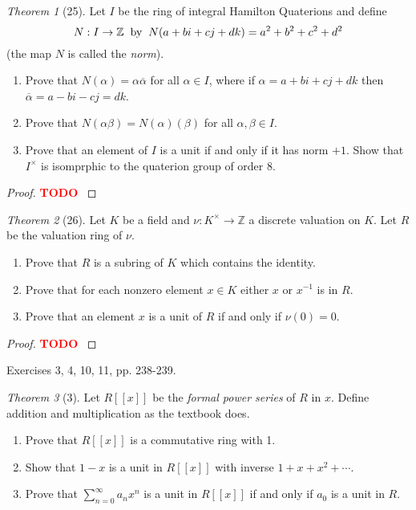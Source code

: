 \documentclass[12pt]{article}
\theoremstyle{remark}
\theoremstyle{named}
\newtheorem*{theorem}{Theorem}
\newcommand{\todo}{\textcolor{red}{\textbf{TODO} }}
\renewcommand{\a}{\alpha}
\renewcommand{\b}{\beta}
\newcommand{\Z}{\mathbb Z}
\begin{document}
\begin{theorem}[25]
    Let \(I\) be the ring of integral Hamilton Quaterions and define 
    \[N : I \to \Z \hspace{2mm} \text{by} \hspace{2mm} N(a + bi + cj + dk) = a^2 + b^2 + c^2 + d^2\]
    (the map \(N\) is called the \textit{norm}).
    \begin{enumerate}
        \item Prove that \(N(\alpha) = \alpha\overline{\alpha}\) for all \(\alpha \in I\), where if \(\alpha = a + bi + cj + dk\) then \(\overline{\alpha} = a - bi - cj = dk\).
        \item Prove that \(N(\alpha\beta) = N(\alpha)(\beta)\) for all \(\a, \b \in I\).
        \item Prove that an element of \(I\) is a unit if and only if it has norm \(+1\). Show that \(I^\times\) is isomprphic to the quaterion group of order 8.
    \end{enumerate}
\end{theorem}

\begin{proof}
    \todo
\end{proof}

\begin{theorem}[26]
    Let \(K\) be a field and \(\nu : K^\times \to \Z\) a discrete valuation on \(K\). Let \(R\) be the valuation ring of \(\nu\).
    \begin{enumerate}
        \item Prove that \(R\) is a subring of \(K\) which contains the identity.
        \item Prove that for each nonzero element \(x \in K\) either \(x\) or \(x^{-1}\) is in \(R\). 
        \item Prove that an element \(x\) is a unit of \(R\) if and only if \(\nu(0) = 0\).
    \end{enumerate}
\end{theorem}

\begin{proof}
    \todo
\end{proof}

Exercises 3, 4, 10, 11, pp. 238-239.

\begin{theorem}[3]
    Let \(R[[x]]\) be the \textit{formal power series} of \(R\) in \(x\). Define addition and multiplication as the textbook does.
    \begin{enumerate}
        \item Prove that \(R[[x]]\) is a commutative ring with 1.
        \item Show that \(1 - x\) is a unit in \(R[[x]]\) with inverse \(1 + x + x^2 + \cdots\).
        \item Prove that \(\sum_{n = 0}^\infty a_n x^n\) is a unit in \(R[[x]]\) if and only if \(a_0\) is a unit in \(R\).
    \end{enumerate}
\end{theorem}
\end{document}
